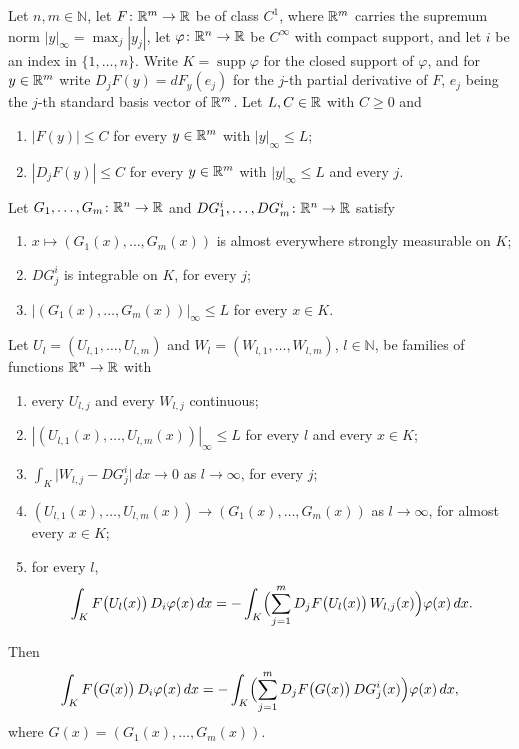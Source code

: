 \begin{helper}
Let $n,m\in\mathbb{N}$, let $F\colon\mathbb{R}^m\to\mathbb{R}$ be of class $C^1$, where $\mathbb{R}^m$
carries the supremum norm $|y|_\infty=\max_j|y_j|$, let
$\varphi\colon\mathbb{R}^n\to\mathbb{R}$ be $C^\infty$ with compact support, and let $i$ be an
index in $\{1,\dots,n\}$.  Write $K=\operatorname{supp}\varphi$ for the closed
support of $\varphi$, and for $y\in\mathbb{R}^m$ write $D_jF(y)=dF_y(e_j)$ for the
$j$-th partial derivative of $F$, $e_j$ being the $j$-th standard basis vector
of $\mathbb{R}^m$.  Let $L,C\in\mathbb{R}$ with $C\ge0$ and
\begin{enumerate}
\item[(H1)] $|F(y)|\le C$ for every $y\in\mathbb{R}^m$ with $|y|_\infty\le L$;
\item[(H2)] $|D_jF(y)|\le C$ for every $y\in\mathbb{R}^m$ with $|y|_\infty\le L$ and
  every $j$.
\end{enumerate}
Let $G_1,\dots,G_m\colon\mathbb{R}^n\to\mathbb{R}$ and $DG^i_1,\dots,DG^i_m\colon\mathbb{R}^n\to\mathbb{R}$
satisfy
\begin{enumerate}
\item[(H3)] $x\mapsto(G_1(x),\dots,G_m(x))$ is almost everywhere strongly
  measurable on $K$;
\item[(H4)] $DG^i_j$ is integrable on $K$, for every $j$;
\item[(H5)] $|(G_1(x),\dots,G_m(x))|_\infty\le L$ for every $x\in K$.
\end{enumerate}
Let $U_l=(U_{l,1},\dots,U_{l,m})$ and $W_l=(W_{l,1},\dots,W_{l,m})$,
$l\in\mathbb{N}$, be families of functions $\mathbb{R}^n\to\mathbb{R}$ with
\begin{enumerate}
\item[(H6)] every $U_{l,j}$ and every $W_{l,j}$ continuous;
\item[(H7)] $|(U_{l,1}(x),\dots,U_{l,m}(x))|_\infty\le L$ for every $l$ and
  every $x\in K$;
\item[(H8)] $\displaystyle\int_K\bigl|W_{l,j}-DG^i_j\bigr|\,dx\to0$ as
  $l\to\infty$, for every $j$;
\item[(H9)] $(U_{l,1}(x),\dots,U_{l,m}(x))\to(G_1(x),\dots,G_m(x))$ as
  $l\to\infty$, for almost every $x\in K$;
\item[(H10)] for every $l$,
  \[
  \int_K F\bigl(U_l(x)\bigr)\,D_i\varphi(x)\,dx
  =-\int_K\Bigl(\sum_{j=1}^m D_jF\bigl(U_l(x)\bigr)\,W_{l,j}(x)\Bigr)\varphi(x)\,dx .
  \]
\end{enumerate}
Then
\[
\int_K F\bigl(G(x)\bigr)\,D_i\varphi(x)\,dx
=-\int_K\Bigl(\sum_{j=1}^m D_jF\bigl(G(x)\bigr)\,DG^i_j(x)\Bigr)\varphi(x)\,dx ,
\]
where $G(x)=(G_1(x),\dots,G_m(x))$.
\end{helper}

